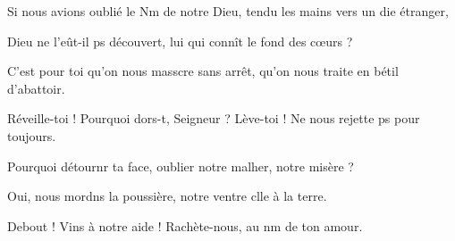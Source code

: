 \item Si nous avions oublié le Nm de notre Dieu,\psstar{} tendu les mains vers un die étranger,
\item Dieu ne l’eût-il ps découvert,\psstar{} lui qui connît le fond des cœurs ?
\item C’est pour toi qu’on nous masscre sans arrêt,\psstar{} qu’on nous traite en bétil d’abattoir.
\item Réveille-toi ! Pourquoi dors-t, Seigneur ?\psstar{} Lève-toi ! Ne nous rejette ps pour toujours.
\item Pourquoi détournr ta face,\psstar{} oublier notre malher, notre misère ?
\item Oui, nous mordns la poussière,\psstar{} notre ventre clle à la terre.
\item Debout ! Vins à notre aide !\psstar{} Rachète-nous, au nm de ton amour.